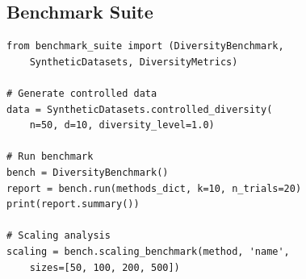 \documentclass[11pt]{article}
\begin{document}
\subsection{Benchmark Suite}

\begin{verbatim}
from benchmark_suite import (DiversityBenchmark,
    SyntheticDatasets, DiversityMetrics)

# Generate controlled data
data = SyntheticDatasets.controlled_diversity(
    n=50, d=10, diversity_level=1.0)

# Run benchmark
bench = DiversityBenchmark()
report = bench.run(methods_dict, k=10, n_trials=20)
print(report.summary())

# Scaling analysis
scaling = bench.scaling_benchmark(method, 'name',
    sizes=[50, 100, 200, 500])
\end{verbatim}
\end{document}
